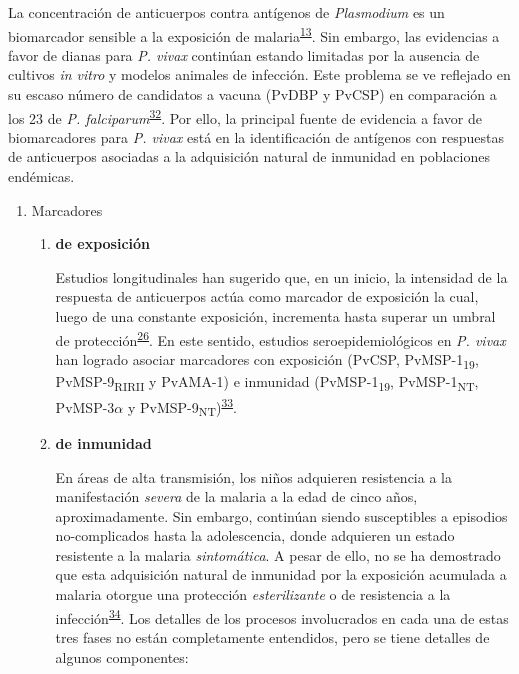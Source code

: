 \documentclass[a4paper]{article}
\begin{document}
La concentración de anticuerpos contra antígenos de \emph{Plasmodium} es
un biomarcador sensible a la exposición de
malaria\textsuperscript{\protect\hyperlink{ref-elliott2014}{13}}. Sin
embargo, las evidencias a favor de dianas para \emph{P. vivax} continúan
estando limitadas por la ausencia de cultivos \emph{in vitro} y modelos
animales de infección. Este problema se ve reflejado en su escaso número
de candidatos a vacuna (PvDBP y PvCSP) en comparación a los 23 de
\emph{P.
falciparum}\textsuperscript{\protect\hyperlink{ref-rainbow2016}{32}}.
Por ello, la principal fuente de evidencia a favor de biomarcadores para
\emph{P. vivax} está en la identificación de antígenos con respuestas de
anticuerpos asociadas a la adquisición natural de inmunidad en
poblaciones endémicas.

\begin{enumerate}
\def\labelenumi{\alph{enumi}.}
\item
  Marcadores

  \begin{enumerate}
  \def\labelenumii{\roman{enumii}.}
  \item
    \textbf{de exposición}

    Estudios longitudinales han sugerido que, en un inicio, la
    intensidad de la respuesta de anticuerpos actúa como marcador de
    exposición la cual, luego de una constante exposición, incrementa
    hasta superar un umbral de
    protección\textsuperscript{\protect\hyperlink{ref-Stanisic2015}{26}}.
    En este sentido, estudios seroepidemiológicos en \emph{P. vivax} han
    logrado asociar marcadores con exposición (PvCSP,
    PvMSP-1\textsubscript{19}, PvMSP-9\textsubscript{RIRII} y PvAMA-1) e
    inmunidad (PvMSP-1\textsubscript{19}, PvMSP-1\textsubscript{NT},
    PvMSP-3\(\alpha\) y
    PvMSP-9\textsubscript{NT})\textsuperscript{\protect\hyperlink{ref-cutts2014meta}{33}}.
  \item
    \textbf{de inmunidad}

    En áreas de alta transmisión, los niños adquieren resistencia a la
    manifestación \emph{severa} de la malaria a la edad de cinco años,
    aproximadamente. Sin embargo, continúan siendo susceptibles a
    episodios no-complicados hasta la adolescencia, donde adquieren un
    estado resistente a la malaria \emph{sintomática}. A pesar de ello,
    no se ha demostrado que esta adquisición natural de inmunidad por la
    exposición acumulada a malaria otorgue una protección
    \emph{esterilizante} o de resistencia a la
    infección\textsuperscript{\protect\hyperlink{ref-crompton2014rev}{34}}.
    Los detalles de los procesos involucrados en cada una de estas tres
    fases no están completamente entendidos, pero se tiene detalles de
    algunos componentes:


\end{enumerate}
\end{enumerate}
\end{document}
